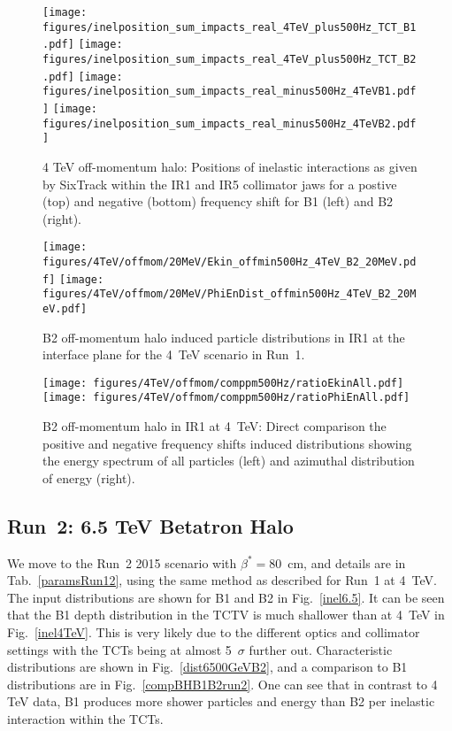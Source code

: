 \begin{figure}
\begin{center}
\texttt{[image: figures/inelposition\_sum\_impacts\_real\_4TeV\_plus500Hz\_TCT\_B1.pdf]}
\texttt{[image: figures/inelposition\_sum\_impacts\_real\_4TeV\_plus500Hz\_TCT\_B2.pdf]}
\texttt{[image: figures/inelposition\_sum\_impacts\_real\_minus500Hz\_4TeVB1.pdf]}
\texttt{[image: figures/inelposition\_sum\_impacts\_real\_minus500Hz\_4TeVB2.pdf]}
\end{center}
\vspace{-0.6cm}
 \caption{4 TeV off-momentum halo: Positions of inelastic interactions as given by SixTrack within the IR1 and IR5 collimator jaws for a postive (top) and negative (bottom) frequency shift for B1 (left) and B2 (right).
  \label{inel4TeVOffmom}}
\end{figure}


\begin{figure}
\begin{center}
  \texttt{[image: figures/4TeV/offmom/20MeV/Ekin\_offmin500Hz\_4TeV\_B2\_20MeV.pdf]}
  \texttt{[image: figures/4TeV/offmom/20MeV/PhiEnDist\_offmin500Hz\_4TeV\_B2\_20MeV.pdf]}
\end{center}
\vspace{-0.6cm}
 \caption{B2 off-momentum halo induced particle distributions in IR1 at the interface plane for the 4~TeV scenario in Run~1.
  \label{offmom4TeV}}
\end{figure}

\begin{figure}
  \centering
  \texttt{[image: figures/4TeV/offmom/comppm500Hz/ratioEkinAll.pdf]}
  \texttt{[image: figures/4TeV/offmom/comppm500Hz/ratioPhiEnAll.pdf]}
  \caption{B2 off-momentum halo in IR1 at 4~TeV: Direct comparison the positive and negative frequency shifts induced distributions showing the energy spectrum of all particles (left) and azimuthal distribution of energy (right).
    \label{compPM}}
\end{figure}

\subsection{Run~2: 6.5 TeV Betatron Halo}

We move to the Run~2 2015 scenario with $\beta^* = 80$~cm, and details are in Tab.~\ref{paramsRun12}, using the same method as described for Run~1 at 4~TeV. The input distributions are shown for B1 and B2 in Fig.~\ref{inel6.5}. It can be seen that the B1 depth distribution in the TCTV is much shallower than at 4~TeV in Fig.~\ref{inel4TeV}. This is very likely due to the different optics and collimator settings with the TCTs being at almost 5~$\sigma$ further out. Characteristic distributions are shown in Fig.~\ref{dist6500GeVB2}, and a comparison to B1 distributions are in Fig.~\ref{compBHB1B2run2}. One can see that in contrast to 4 TeV data, B1 produces more shower particles and energy than B2 per inelastic interaction within the TCTs. 


